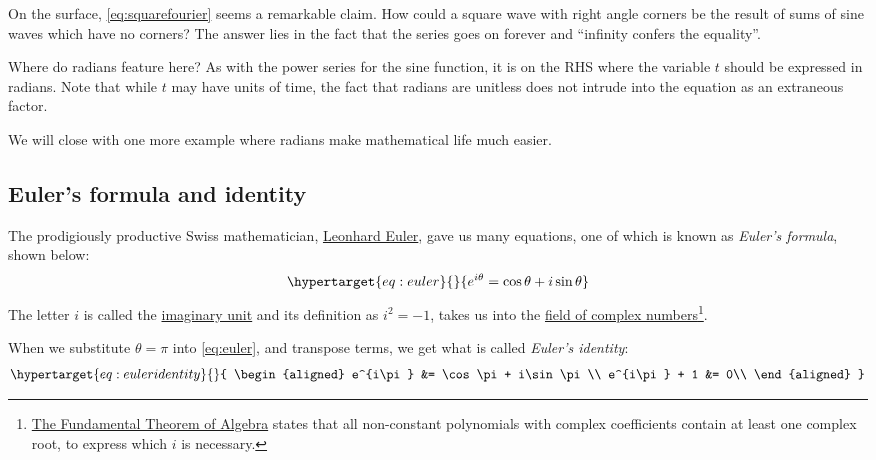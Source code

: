 \documentclass[
  a4paper,
]{article}
\begin{document}
On the surface, \cref{eq:squarefourier} seems a remarkable claim. How
could a square wave with right angle corners be the result of sums of
sine waves which have no corners? The answer lies in the fact that the
series goes on forever and ``infinity confers the equality''.

Where do radians feature here? As with the power series for the sine
function, it is on the RHS where the variable \(t\) should be expressed
in radians. Note that while \(t\) may have units of time, the fact that
radians are unitless does not intrude into the equation as an extraneous
factor.

We will close with one more example where radians make mathematical life
much easier.

\hypertarget{eulers-formula-and-identity}{%
\subsection{Euler's formula and
identity}\label{eulers-formula-and-identity}}

The prodigiously productive Swiss mathematician,
\href{https://www.britannica.com/biography/Leonhard-Euler}{Leonhard
Euler}, gave us many equations, one of which is known as \emph{Euler's
formula}, shown below: \begin{equation}\protect\hypertarget{eq:euler}{}{
e^{i\theta} = \cos\theta + i\sin\theta
}\label{eq:euler}\end{equation} The letter \(i\) is called the
\href{https://en.wikipedia.org/wiki/Imaginary_unit}{imaginary unit} and
its definition as \(i^{2} = -1\), takes us into the
\href{https://en.wikipedia.org/wiki/Complex_number}{field of complex
numbers}\footnote{\href{https://en.wikipedia.org/wiki/Fundamental_theorem_of_algebra}{The
  Fundamental Theorem of Algebra} states that all non-constant
  polynomials with complex coefficients contain at least one complex
  root, to express which \(i\) is necessary.}.

When we substitute \(\theta=\pi\) into \cref{eq:euler}, and transpose
terms, we get what is called \emph{Euler's identity}:
\begin{equation}\protect\hypertarget{eq:euleridentity}{}{
\begin{aligned}
e^{i\pi} &= \cos\pi + i\sin\pi\\
e^{i\pi} + 1 &= 0\\
\end{aligned}
}\label{eq:euleridentity}\end{equation}
\end{document}
